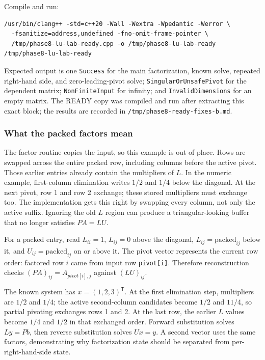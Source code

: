 Compile and run:

\begin{verbatim}
/usr/bin/clang++ -std=c++20 -Wall -Wextra -Wpedantic -Werror \
  -fsanitize=address,undefined -fno-omit-frame-pointer \
  /tmp/phase8-lu-lab-ready.cpp -o /tmp/phase8-lu-lab-ready
/tmp/phase8-lu-lab-ready
\end{verbatim}

Expected output is one \texttt{Success} for the main factorization, known solve, repeated right-hand side, and zero-leading-pivot solve; \texttt{SingularOrUnsafePivot} for the dependent matrix; \texttt{NonFiniteInput} for infinity; and \texttt{InvalidDimensions} for an empty matrix. The READY copy was compiled and run after extracting this exact block; the results are recorded in \texttt{/tmp/phase8-ready-fixes-b.md}.

\subsubsection{What the packed factors mean}\label{what-the-packed-factors-mean}

The factor routine copies the input, so this example is out of place. Rows are swapped across the entire packed row, including columns before the active pivot. Those earlier entries already contain the multipliers of \(L\). In the numeric example, first-column elimination writes \(1/2\) and \(1/4\) below the diagonal. At the next pivot, row 1 and row 2 exchange; these stored multipliers must exchange too. The implementation gets this right by swapping every column, not only the active suffix. Ignoring the old \(L\) region can produce a triangular-looking buffer that no longer satisfies \(PA=LU\).

For a packed entry, read \(L_{ii}=1\), \(L_{ij}=0\) above the diagonal, \(L_{ij}=\text{packed}_{ij}\) below it, and \(U_{ij}=\text{packed}_{ij}\) on or above it. The pivot vector represents the current row order: factored row \(i\) came from input row \texttt{pivot{[}i{]}}. Therefore reconstruction checks \((PA)_{ij}=A_{pivot[i],j}\) against \((LU)_{ij}\).

The known system has \(x=(1,2,3)^\mathsf T\). At the first elimination step, multipliers are \(1/2\) and \(1/4\); the active second-column candidates become \(1/2\) and \(11/4\), so partial pivoting exchanges rows 1 and 2. At the last row, the earlier \(L\) values become \(1/4\) and \(1/2\) in that exchanged order. Forward substitution solves \(Ly=Pb\), then reverse substitution solves \(Ux=y\). A second vector uses the same factors, demonstrating why factorization state should be separated from per-right-hand-side state.

